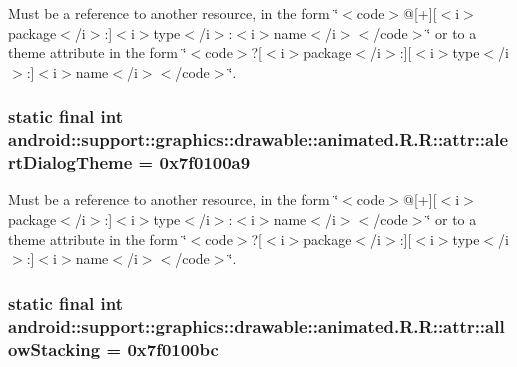 Must be a reference to another resource, in the form \char`\"{}$<$code$>$@\mbox{[}+\mbox{]}\mbox{[}$<$i$>$package$<$/i$>$:\mbox{]}$<$i$>$type$<$/i$>$:$<$i$>$name$<$/i$>$$<$/code$>$\char`\"{} or to a theme attribute in the form \char`\"{}$<$code$>$?\mbox{[}$<$i$>$package$<$/i$>$:\mbox{]}\mbox{[}$<$i$>$type$<$/i$>$:\mbox{]}$<$i$>$name$<$/i$>$$<$/code$>$\char`\"{}. \hypertarget{classandroid_1_1support_1_1graphics_1_1drawable_1_1animated_1_1_r_1_1attr_d67124e62eb32b2ea41cff9f3dcd9f85}{
\subsubsection[{alertDialogTheme}]{\setlength{\rightskip}{0pt plus 5cm}static final int android::support::graphics::drawable::animated.R.R::attr::alertDialogTheme = 0x7f0100a9}}
\label{classandroid_1_1support_1_1graphics_1_1drawable_1_1animated_1_1_r_1_1attr_d67124e62eb32b2ea41cff9f3dcd9f85}


Must be a reference to another resource, in the form \char`\"{}$<$code$>$@\mbox{[}+\mbox{]}\mbox{[}$<$i$>$package$<$/i$>$:\mbox{]}$<$i$>$type$<$/i$>$:$<$i$>$name$<$/i$>$$<$/code$>$\char`\"{} or to a theme attribute in the form \char`\"{}$<$code$>$?\mbox{[}$<$i$>$package$<$/i$>$:\mbox{]}\mbox{[}$<$i$>$type$<$/i$>$:\mbox{]}$<$i$>$name$<$/i$>$$<$/code$>$\char`\"{}. \hypertarget{classandroid_1_1support_1_1graphics_1_1drawable_1_1animated_1_1_r_1_1attr_e649184241ecb1160427b77bbd04fdde}{
\subsubsection[{allowStacking}]{\setlength{\rightskip}{0pt plus 5cm}static final int android::support::graphics::drawable::animated.R.R::attr::allowStacking = 0x7f0100bc}}
\label{classandroid_1_1support_1_1graphics_1_1drawable_1_1animated_1_1_r_1_1attr_e649184241ecb1160427b77bbd04fdde}


